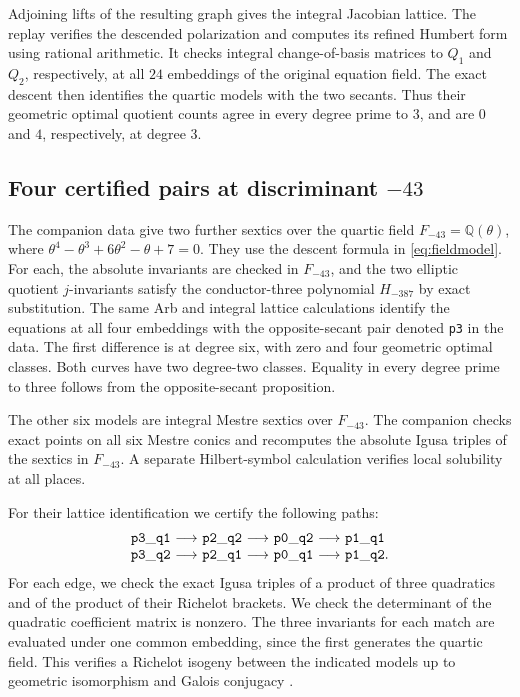 \documentclass[11pt,letterpaper]{amsart}
\theoremstyle{definition}
\numberwithin{equation}{section}
\newcommand{\Q}{\mathbb Q}
\begin{document}
Adjoining lifts of the resulting graph gives the integral Jacobian
lattice. The replay verifies the descended polarization and computes
its refined Humbert form using rational arithmetic. It checks integral
change-of-basis matrices to \(Q_1\) and \(Q_2\), respectively, at all
\(24\) embeddings of the original equation field. The exact descent
then identifies the quartic models with the two secants. Thus their
geometric optimal quotient counts agree in every degree prime to
\(3\), and are \(0\) and \(4\), respectively, at degree \(3\).

\subsection{Four certified pairs at discriminant \texorpdfstring{\(-43\)}{-43}}

The companion data give two further sextics over the quartic field
\(F_{-43}=\Q(\theta)\), where \(\theta^4-\theta^3+6\theta^2-\theta+7=0\).
They use the descent formula in \eqref{eq:fieldmodel}. For each, the
absolute invariants are checked in \(F_{-43}\), and the two elliptic
quotient \(j\)-invariants satisfy the conductor-three polynomial
\(H_{-387}\) by exact substitution. The same Arb and integral lattice
calculations identify the equations at all four embeddings with the
opposite-secant pair denoted \texttt{p3} in the data. The first difference
is at degree six, with zero and four geometric optimal classes. Both
curves have two degree-two classes. Equality in every degree prime to
three follows from the opposite-secant proposition.

The other six models are integral Mestre sextics over \(F_{-43}\).
The companion checks exact points on all six Mestre conics and
recomputes the absolute Igusa triples of the sextics in \(F_{-43}\).
A separate Hilbert-symbol calculation verifies local solubility at
all places.

For their lattice identification we certify the following paths:
\[
\begin{array}{r@{\ \longrightarrow\ }l@{\ \longrightarrow\ }l@{\ \longrightarrow\ }l}
 \mathtt{p3\_q1}&\mathtt{p2\_q2}&\mathtt{p0\_q2}&\mathtt{p1\_q1}\\
 \mathtt{p3\_q2}&\mathtt{p2\_q1}&\mathtt{p0\_q1}&\mathtt{p1\_q2}.
\end{array}
\]
For each edge, we check the exact Igusa triples of a product of three
quadratics and of the product of their Richelot brackets. We check
the determinant of the quadratic coefficient matrix is nonzero.
The three invariants for each match are evaluated under one common
embedding, since the first generates the quartic field. This verifies
a Richelot isogeny between the indicated models up to geometric
isomorphism and Galois conjugacy \cite{BGL}.
\end{document}
